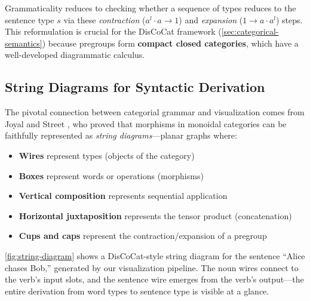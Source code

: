 \documentclass[
]{article}
\providecommand{\tightlist}{%
  \setlength{\itemsep}{0pt}\setlength{\parskip}{0pt}}
\numberwithin{equation}{section}
\begin{document}
Grammaticality reduces to checking whether a sequence of types reduces
to the sentence type \(s\) via these \emph{contraction}
(\(a^l \cdot a \to 1\)) and \emph{expansion} (\(1 \to a \cdot a^l\))
steps. This reformulation is crucial for the DisCoCat framework
(\autoref{sec:categorical-semantics}) because pregroups form
\textbf{compact closed categories}, which have a well-developed
diagrammatic calculus.

\subsection{String Diagrams for Syntactic
Derivation}\label{string-diagrams-for-syntactic-derivation}

The pivotal connection between categorial grammar and visualization
comes from Joyal and Street \citeyearpar{joyalstreet1991geometry}, who
proved that morphisms in monoidal categories can be faithfully
represented as \emph{string diagrams}---planar graphs where:

\begin{itemize}
\tightlist
\item
  \textbf{Wires} represent types (objects of the category)
\item
  \textbf{Boxes} represent words or operations (morphisms)
\item
  \textbf{Vertical composition} represents sequential application
\item
  \textbf{Horizontal juxtaposition} represents the tensor product
  (concatenation)
\item
  \textbf{Cups and caps} represent the contraction/expansion of a
  pregroup
\end{itemize}

\autoref{fig:string-diagram} shows a DisCoCat-style string diagram for
the sentence ``Alice chases Bob,'' generated by our visualization
pipeline. The noun wires connect to the verb's input slots, and the
sentence wire emerges from the verb's output---the entire derivation
from word types to sentence type is visible at a glance.
\end{document}
